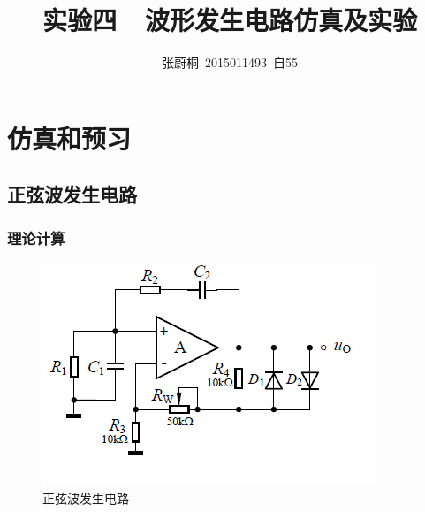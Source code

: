 \documentclass[UTF8,a4paper]{paper}
\title{实验四\ \ 波形发生电路仿真及实验}
\author{张蔚桐\ 2015011493\ 自55}
\begin{document}
\maketitle
\section{仿真和预习}
\subsection{正弦波发生电路}
\subsubsection{理论计算}
\begin{multicols}{2}
\begin {figure}[H]
\includegraphics [width=\columnwidth]{ac.png}
\caption{正弦波发生电路}
\label{ACCirc}
\end {figure}
\end{multicols}
\end{document}
